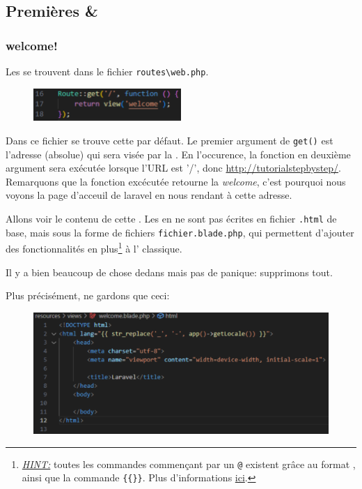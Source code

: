 \subsection{Premières \routes{} \& \views{}}

\subsubsection[welcome!]{welcome!\label{sec:welcome!}}
Les \routes{} se trouvent dans le fichier \verb|routes\web.php|. \\
\begin{figure}
    \vspace{-0.5cm}
    \includegraphics[width=0.5\textwidth]{figures-C1/basic_route.pdf}
\end{figure}
Dans ce fichier se trouve cette \route{} par défaut. Le premier argument de \verb|get()| est l'adresse (absolue) qui sera visée par la \route{}. En l'occurence, la fonction en deuxième argument sera exécutée lorsque l'URL est '/', donc \url{http://tutorialstepbystep/}. Remarquons que la fonction excécutée retourne la \view{} \textit{welcome}, c'est pourquoi nous voyons la page d'acceuil de laravel en nous rendant à cette adresse.

Allons voir le contenu de cette \view{}. Les \views{} en \laravel{} ne sont pas écrites en fichier \verb|.html| de base, mais sous la forme de fichiers \verb|fichier.blade.php|, qui permettent d'ajouter des fonctionnalités en plus\footnote{\textit{\underline{HINT:}} toutes les commandes commençant par un \verb|@| existent grâce au format \blade{}, ainsi que la commande \verb|{{}}|. Plus d'informations \href{https://laravel.com/docs/10.x/blade#blade-directives}{ici}.} à l'\html{} classique. 

Il y a bien beaucoup de chose dedans mais pas de panique: supprimons tout.

Plus précisément, ne gardons que ceci:

\begin{figure}[!h]
    \centering
    \includegraphics[width=\textwidth]{figures-C1/welcome_blade_empty.pdf}
\end{figure}


